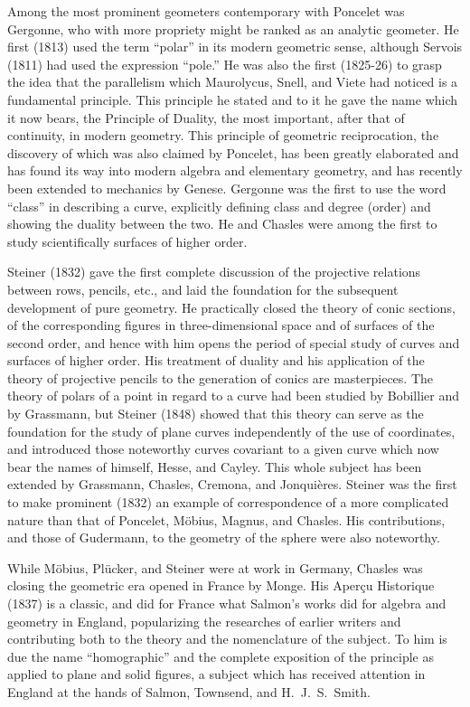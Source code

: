 \documentclass[oneside]{book}
\begin{document}
Among the most prominent geometers contemporary with Poncelet was
Gergonne, who with more propriety might be ranked as an analytic
geometer. He first (1813) used the term ``polar'' in its modern
geometric sense, although Servois (1811) had used the expression
``pole.'' He was also the first (1825-26) to grasp the idea that
the parallelism which Maurolycus, Snell, and Viete had noticed is a
fundamental principle. This principle he stated and to it he gave
the name which it now bears, the Principle of Duality, the most
important, after that of continuity, in modern geometry. This
principle of geometric reciprocation, the discovery of which was
also claimed by Poncelet, has been greatly elaborated and has found
its way into modern algebra and elementary geometry, and has
recently been extended to mechanics by Genese. Gergonne was the
first to use the word ``class'' in describing a curve, explicitly
defining class and degree (order) and showing the duality between
the two. He and Chasles were among the first to study scientifically
surfaces of higher order.

Steiner (1832) gave the first complete discussion of the projective
relations between rows, pencils, etc., and laid the foundation for
the subsequent development of pure geometry. He practically closed
the theory of conic sections, of the corresponding figures in
three-dimensional space and of surfaces of the second order, and
hence with him opens the period of special study of curves and
surfaces of higher order. His treatment of duality and his
application of the theory of projective pencils to the generation of
conics are masterpieces. The theory of polars of a point in regard
to a curve had been studied by Bobillier and by Grassmann, but
Steiner (1848) showed that this theory can serve as the foundation
for the study of plane curves independently of the use of
coordinates, and introduced those noteworthy curves covariant to a
given curve which now bear the names of himself, Hesse, and Cayley.
This whole subject has been extended by Grassmann, Chasles,
Cremona, and Jonqui\`eres. Steiner was the first to make prominent
(1832) an example of correspondence of a more complicated nature
than that of Poncelet, M\"obius, Magnus, and Chasles. His
contributions, and those of Gudermann, to the geometry of the sphere
were also noteworthy.

While M\"obius, Pl\"ucker, and Steiner were at work in Germany, Chasles
was closing the geometric era opened in France by Monge. His Aper\c{c}u
Historique (1837) is a classic, and did for France what Salmon's
works did for algebra and geometry in England, popularizing the
researches of earlier writers and contributing both to the theory
and the nomenclature of the subject. To him is due the name
``homographic'' and the complete exposition of the principle as
applied to plane and solid figures, a subject which has received
attention in England at the hands of Salmon, Townsend, and
H.~J.~S.~Smith.
\end{document}
